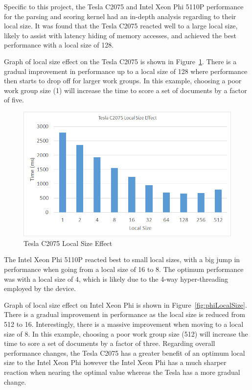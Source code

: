 Specific to this project, the Tesla C2075 and Intel Xeon Phi 5110P performance
for the parsing and scoring kernel had an in-depth analysis regarding to their
local size. It was found that the Tesla C2075 reacted well to a large local
size, likely to assist with latency hiding of memory accesses, and achieved the
best performance with a local size of 128.

Graph of local size effect on the Tesla C2075 is shown in
Figure~\ref{fig:teslaLocalSize}. There is a gradual improvement in performance
up to a local size of 128 where performance then starts to drop off for larger
work groups. In this example, choosing a poor work group size (1) will increase
the time to score a set of documents by a factor of five.

\begin{figure}[H]
\includegraphics[width=\linewidth]{images/teslaLocalSize.png}
\caption{Tesla C2075 Local Size Effect}
\label{fig:teslaLocalSize}
\end{figure}

The Intel Xeon Phi 5110P reacted best to small local sizes, with a big jump in
performance when going from a local size of 16 to 8. The optimum performance was
with a local size of 4, which is likely due to the 4-way hyper-threading
employed by the device.

Graph of local size effect on Intel Xeon Phi is shown in
Figure~\ref{fig:phiLocalSize}. There is a gradual improvement in performance as
the local size is reduced from 512 to 16. Interestingly, there is a massive
improvement when moving to a local size of 8. In this example, choosing a poor
work group size (512) will increase the time to sore a set of documents by a
factor of three. Regarding overall performance changes, the Tesla C2075 has a
greater benefit of an optimum local size to the Intel Xeon Phi however the Intel
Xeon Phi has a much sharper reaction when nearing the optimal value whereas the
Tesla has a more gradual change.

